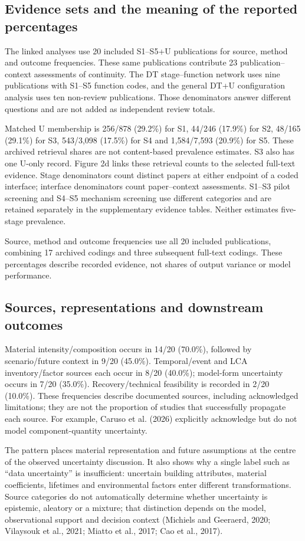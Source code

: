 \subsection{Evidence sets and the meaning of the reported percentages}
The linked analyses use 20 included S1–S5+U publications for source, method and outcome frequencies. These same publications contribute 23 publication–context assessments of continuity. The DT stage–function network uses nine publications with S1–S5 function codes, and the general DT+U configuration analysis uses ten non-review publications. Those denominators answer different questions and are not added as independent review totals.

Matched U membership is 256/878 (29.2\%) for S1, 44/246 (17.9\%) for S2, 48/165 (29.1\%) for S3, 543/3,098 (17.5\%) for S4 and 1,584/7,593 (20.9\%) for S5. These archived retrieval shares are not content-based prevalence estimates. S3 also has one U-only record. Figure 2d links these retrieval counts to the selected full-text evidence. Stage denominators count distinct papers at either endpoint of a coded interface; interface denominators count paper–context assessments. S1–S3 pilot screening and S4–S5 mechanism screening use different categories and are retained separately in the supplementary evidence tables. Neither estimates five-stage prevalence.

Source, method and outcome frequencies use all 20 included publications, combining 17 archived codings and three subsequent full-text codings. These percentages describe recorded evidence, not shares of output variance or model performance.


\subsection{Sources, representations and downstream outcomes}
Material intensity/composition occurs in 14/20 (70.0\%), followed by scenario/future context in 9/20 (45.0\%). Temporal/event and LCA inventory/factor sources each occur in 8/20 (40.0\%); model-form uncertainty occurs in 7/20 (35.0\%). Recovery/technical feasibility is recorded in 2/20 (10.0\%). These frequencies describe documented sources, including acknowledged limitations; they are not the proportion of studies that successfully propagate each source. For example, Caruso et al. (2026) explicitly acknowledge but do not model component-quantity uncertainty.

The pattern places material representation and future assumptions at the centre of the observed uncertainty discussion. It also shows why a single label such as “data uncertainty” is insufficient: uncertain building attributes, material coefficients, lifetimes and environmental factors enter different transformations. Source categories do not automatically determine whether uncertainty is epistemic, aleatory or a mixture; that distinction depends on the model, observational support and decision context (Michiels and Geeraerd, 2020; Vilaysouk et al., 2021; Miatto et al., 2017; Cao et al., 2017).


